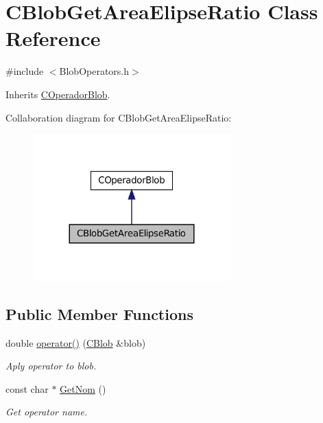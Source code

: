 \hypertarget{class_c_blob_get_area_elipse_ratio}{
\section{CBlobGetAreaElipseRatio Class Reference}
\label{class_c_blob_get_area_elipse_ratio}
}


{\ttfamily \#include $<$BlobOperators.h$>$}



Inherits \hyperlink{class_c_operador_blob}{COperadorBlob}.



Collaboration diagram for CBlobGetAreaElipseRatio:
\nopagebreak
\begin{figure}[H]
\begin{center}
\leavevmode
\includegraphics[width=216pt]{class_c_blob_get_area_elipse_ratio__coll__graph}
\end{center}
\end{figure}
\subsection*{Public Member Functions}
\begin{DoxyCompactItemize}
\item 
double \hyperlink{class_c_blob_get_area_elipse_ratio_a24f9703155af6e963a1ae226cdb71125}{operator()} (\hyperlink{class_c_blob}{CBlob} \&blob)
\begin{DoxyCompactList}\small\item\em Aply operator to blob. \item\end{DoxyCompactList}\item 
const char $\ast$ \hyperlink{class_c_blob_get_area_elipse_ratio_ad50ae738cd5ceff0b9a8af85e499c4b6}{GetNom} ()
\begin{DoxyCompactList}\small\item\em Get operator name. \item\end{DoxyCompactList}\end{DoxyCompactItemize}


